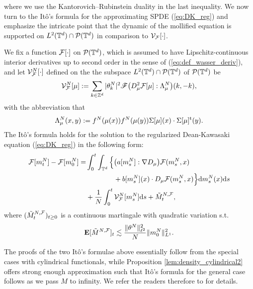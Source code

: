 where we use the Kantorovich–Rubinstein duality in the last inequality.
We now turn to the It\^o's formula for the approximating SPDE (\ref{eq:DK_reg}) and emphasize the intricate point that the dynamic of the mollified equation is supported on $L^2(\mathbb{T}^d) \cap \mathcal{P}(\mathbb{T}^d)$ in comparison to $\mathcal{V}_{\mathcal{F}}[\cdot]$. 
\begin{prop}\label{prop:ito_spde_DK}
We fix a function $\mathcal{F}[\cdot]$ on $\mathcal{P}(\mathbb{T}^d)$, which is assumed to have Lipschitz-continuous interior derivatives up to second order in the sense of (\ref{eq:def_wasser_deriv}), and let $\mathcal{V}_{\mathcal{F}}^N[\cdot]$ defined on the the subspace  $L^2(\mathbb{T}^d) \cap \mathcal{P}(\mathbb{T}^d)$ of $\mathcal{P}(\mathbb{T}^d)$ be 
\begin{equation}\label{eq:def_V_F^N}
\begin{split}
     \mathcal{V}^{N}_{\mathcal{F}}[\mu] :=
     \sum_{k \in \mathbb{Z}^d} |\theta^N_k|^2 \mathscr{F}\big( D^2_{\mu}\mathcal{F}[\mu] : \Lambda_{\mu}^N\big)(k,-k),
\end{split}
\end{equation}
with the abbreviation that
\[
\Lambda_{\mu}^N(x,y) := f^N(\mu(x))f^N(\mu(y)) \Sigma[\mu](x) \cdot \Sigma[\mu]^{\operatorname{t}}(y).
\] 
The It\^o's formula holds for the solution to the regularized Dean-Kawasaki equation (\ref{eq:DK_reg}) in the following form:
\begin{equation}\label{eq:ito_reg}
\begin{split}
\mathcal{F}[m^N_t] - \mathcal{F}[m^N_0] = & \int_0^t\int_{\mathbb{T}^d} \Big\{\big(a[m_s^N]: \nabla D_{\mu}\big)\mathcal{F}(m^N_s,x)\\
&\qquad\qquad + b[m_s^N](x)\cdot D_{\mu}\mathcal{F}(m^N_s,x)\Big\}\mathrm{d}m_s^N(x)\mathrm{d}s\\
& + \frac{1}{N}\int_0^t \mathcal{V}_{\mathcal{F}}^N[m_s^N]\mathrm{d}s + \tilde{M}^{N,\mathcal{F}}_t,
\end{split}
\end{equation}
where $(\tilde{M}^{N,\mathcal{F}}_t)_{t \geq 0}$ is a continuous martingale with quadratic variation s.t. 
$$
\mathbf{E}[\tilde{M}^{N,\mathcal{F}}]_t \lesssim \frac{\|\theta^N\|^2_{\ell^2}}{N}\|m^N_0\|^2_{L^1}.
$$
\end{prop}

The proofs of the two It\^o's formulae above essentially follow from the special cases with cylindrical functionals, while Proposition \ref{lem:density_cylindrical2} offers strong enough approximation such that It\^o's formula for the general case follows as we pass $M$ to infinity. We refer the readers therefore to \cite[Prop. 3.5 \& 3.6]{djurdjevac2025weak} for details. \\



